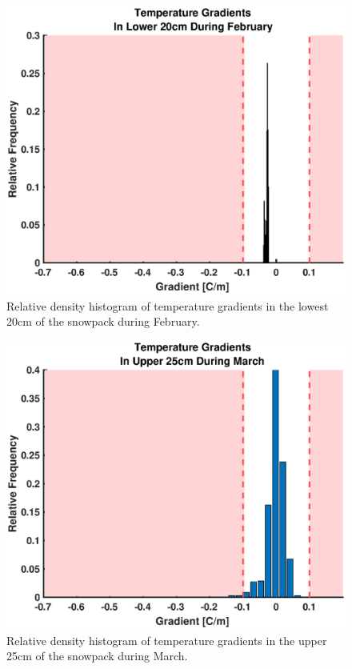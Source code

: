    \begin{figure}[H]
    \centering
    \includegraphics[width=0.7\linewidth]{figures/TempGrad/Feb_L20_RDH.eps}
    \caption{Relative density histogram of temperature gradients in the lowest 20cm of the snowpack during February.}
    \label{fig:Feb_L20_RDH}
 \end{figure}
 
   \begin{figure}[H]
    \centering
    \includegraphics[width=0.7\linewidth]{figures/TempGrad/Mar_U25_RDH.eps}
    \caption{Relative density histogram of temperature gradients in the upper 25cm of the snowpack during March.}
    \label{fig:Mar_U25_RDH}
 \end{figure}
 
